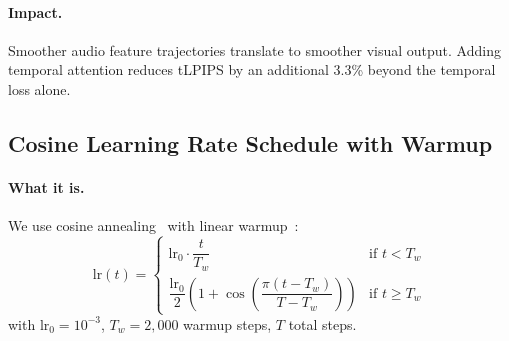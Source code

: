 \documentclass[10pt,twocolumn,letterpaper]{article}
\begin{document}
\paragraph{Impact.}
Smoother audio feature trajectories translate to smoother visual output.
Adding temporal attention reduces tLPIPS by an additional 3.3\% beyond the temporal loss alone.


\subsection{Cosine Learning Rate Schedule with Warmup}
\label{sec:cosine_lr}

\paragraph{What it is.}
We use cosine annealing~\cite{loshchilov2017sgdr} with linear warmup~\cite{goyal2017accurate}:
\begin{equation}
    \text{lr}(t) = \begin{cases}
        \text{lr}_0 \cdot \dfrac{t}{T_w} & \text{if } t < T_w \\[6pt]
        \dfrac{\text{lr}_0}{2}\!\left(1 + \cos\!\left(\dfrac{\pi(t - T_w)}{T - T_w}\right)\right) & \text{if } t \geq T_w
    \end{cases}
    \label{eq:cosine_lr}
\end{equation}
with $\text{lr}_0 = 10^{-3}$, $T_w = 2{,}000$ warmup steps, $T$ total steps.
\end{document}
